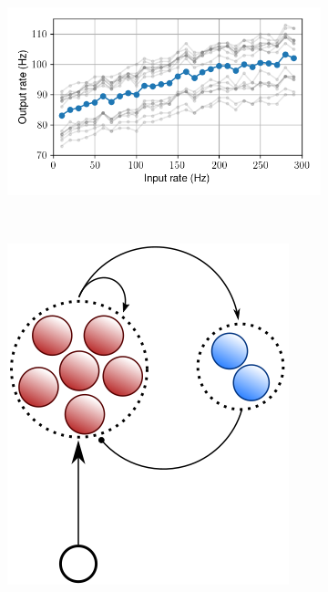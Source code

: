 \begin{figure}[h!]
\begin{subfigure}{.5\textwidth}
    \caption{}
    \label{fig:single_cluster_recurrent_raster}
  \end{subfigure}
      \hfill
  \begin{subfigure}{.3\textwidth}
    \centering
    \includegraphics[width=\textwidth]{img/chapter4/EE_FF_curves.png}
    \caption{}
    \label{fig:single_cluster_recurrent_ff_curves}
  \end{subfigure}
  \\
  \begin{subfigure}{.1\textwidth}
    \centering
    \includegraphics[width=.8\textwidth]{img/chapter4/EI_sketch.png}
    \caption{}
    \label{fig:single_cluster_feedback_sketch}

\end{subfigure}
\end{figure}
